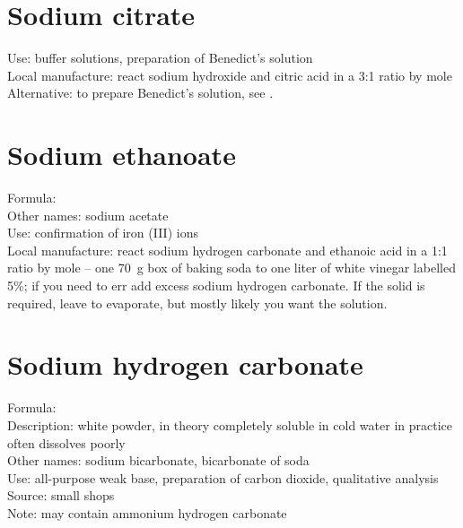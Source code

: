 \section{Sodium citrate}
\label{sec:}
Use: buffer solutions, 
preparation of Benedict's solution\\
Local manufacture: react sodium hydroxide 
and citric acid in a 3:1 ratio by mole\\
Alternative: to prepare Benedict's solution, 
see .

\section{Sodium ethanoate}
\label{sec:sodiumeth}
Formula: \\
Other names: sodium acetate\\
Use: confirmation of iron (III) ions\\
Local manufacture: react sodium hydrogen carbonate 
and ethanoic acid in a 1:1 ratio by mole -- 
one 70~g box of baking soda to one liter of white vinegar labelled 5\%; 
if you need to err add excess sodium hydrogen carbonate. 
If the solid is required, 
leave to evaporate, 
but mostly likely you want the solution.

\section{Sodium hydrogen carbonate}
\label{sec:}
Formula: \\
Description: white powder, 
in theory completely soluble in cold water 
in practice often dissolves poorly\\
Other names: sodium bicarbonate, 
bicarbonate of soda\\
Use: all-purpose weak base, 
preparation of carbon dioxide, 
qualitative analysis\\
Source: small shops \\
Note: may contain ammonium hydrogen carbonate

